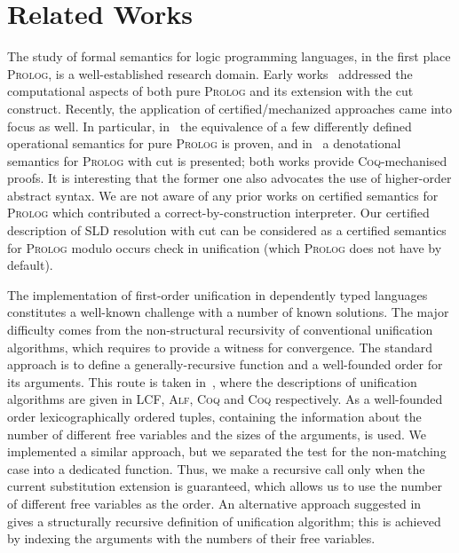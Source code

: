 \section{Related Works}

The study of formal semantics for logic programming languages, in the first place \textsc{Prolog}, is a well-established research domain. Early
works~\cite{JonesMycroftSemantics,DebrayMishraSemantics} addressed the computational aspects of both pure \textsc{Prolog} and its extension
with the cut construct. Recently, the application of certified/mechanized approaches came into focus as well. In particular,
in~\cite{CertifiedPrologEquivalences} the equivalence of a few differently defined operational semantics
for pure \textsc{Prolog} is proven, and in~\cite{CeritfiedDenotationalCut} a denotational semantics for \textsc{Prolog} with cut is presented; both
works provide \textsc{Coq}-mechanised proofs. It is interesting that the former one also advocates the use of higher-order
abstract syntax. We are not aware of any prior works on certified semantics for \textsc{Prolog} which contributed a correct-by-construction
interpreter. Our certified description of SLD resolution with cut can be considered as a certified semantics for \textsc{Prolog} modulo
occurs check in unification (which \textsc{Prolog} does not have by default).

The implementation of first-order unification in dependently typed languages constitutes a well-known challenge with a number of
known solutions. The major difficulty comes from the non-structural recursivity of conventional unification algorithms, which
requires to provide a witness for convergence. The standard approach is to define a generally-recursive function and a well-founded order
for its arguments. This route is taken in~\cite{MGUinLCF,MGUinMLTT,IdempMGUinCoq,TextbookMGUinCoq}, where the descriptions of
unification algorithms are given in \textsc{LCF}, \textsc{Alf}, \textsc{Coq} and \textsc{Coq} respectively. As a well-founded
order lexicographically ordered tuples, containing the information about the number of different free variables and the sizes of
the arguments, is used. We implemented a similar approach, but we separated the test for the non-matching case into a dedicated
function. Thus, we make a recursive call only when the current substitution extension is guaranteed, which allows us to use the
number of different free variables as the order. An alternative approach suggested in~\cite{StructuralMGU} gives a structurally recursive definition of
unification algorithm; this is achieved by indexing the arguments with the numbers of their free variables.

